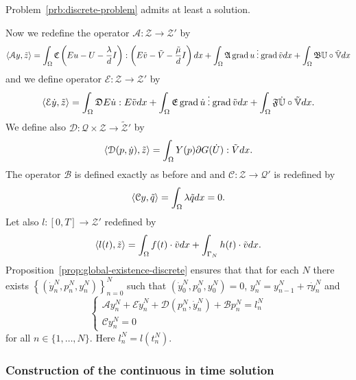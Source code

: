\begin{prop}
\label{prop:global-existence-discrete}
Problem~\ref{prb:discrete-problem} admits at least a solution.
\end{prop}
Now we redefine the operator $\mathcal{A}\colon\mathscr{Z}\to\mathscr{Z}'$ by
\[
\langle\mathcal{A}y,\tilde z\rangle=\int_\Omega\mathfrak{C}\left(Eu-U-\frac{\lambda}{d}I\right):\left(E\tilde v-\tilde V-\frac{\tilde\mu}{d}I\right)dx+\int_\Omega\mathfrak{A}\operatorname{grad} u\mathbin{\vdots}\operatorname{grad}\tilde vdx+\int_\Omega\mathfrak{B}\mathbb{U}\circ\tilde{\mathbb{V}}dx
\]
and we define operator $\mathcal{E}\colon\mathscr{Z}\to\mathscr{Z}'$ by
\[
\langle\mathcal{E}\dot y,\tilde z\rangle=\int_\Omega\mathfrak{D}E\dot u:E\tilde vdx+\int_\Omega\mathfrak{E}\operatorname{grad}\dot u\mathbin{\vdots}\operatorname{grad}\tilde vdx+\int_\Omega\mathfrak{F}\dot{\mathbb U}\circ\tilde{\mathbb{V}}dx.
\]
We define also $\mathcal{D}\colon\mathscr{Q}\times\mathscr{Z}\to\tilde{\mathcal{Z}}'$ by
\[
\langle\mathcal{D}(p,\dot y),\tilde z\rangle=\int_\Omega Y(p)\partial G(\dot U):\tilde Vdx.
\]
The operator $\mathcal{B}$ is defined exactly as before and and $\mathcal{C}\colon\mathscr{Z}\to\mathscr{Q}'$ is redefined by
\[
\langle\mathcal{C}y,\tilde q\rangle=\int_\Omega\lambda\tilde qdx=0.
\]
Let also $l\colon[0,T]\to\mathscr{Z}'$ redefined by
\[
\langle l(t),\tilde z\rangle=\int_\Omega f(t)\cdot\tilde vdx+\int_{\Gamma_N}h(t)\cdot\tilde vdx.
\]
Proposition~\ref{prop:global-existence-discrete} ensures that that for each $N$ there exists $\left\{(\dot y_n^N,p_n^N,y_n^N)\right\}_{n=0}^N$ such that $(\dot y_0^N,p_0^N,y_0^N)=0$, $y_n^N=y_{n-1}^N+\tau\dot y_n^N$ and
\begin{equation}
\label{eqn:discrete-equation}
\begin{cases}
\mathcal{A}y_n^N+\mathcal{E}\dot y_n^N+\mathcal{D}(p_n^N,\dot y_n^N)+\mathcal{B}p_n^N=l_n^N \\
\mathcal{C}y_n^N=0
\end{cases}
\end{equation}
for all $n\in\{1,\dots,N\}$. Here $l_n^N=l(t_n^N)$.

\subsubsection*{Construction of the continuous in time solution}

